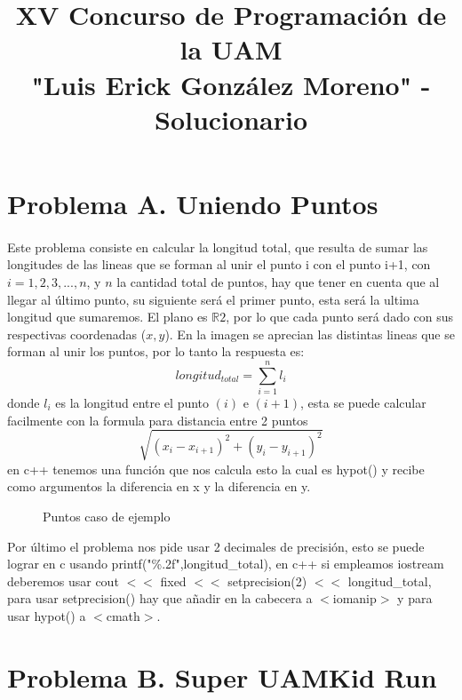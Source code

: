 \documentclass[12pt]{article}
\author{}
\title{XV Concurso de Programación de la UAM \\ 
"Luis Erick González Moreno" - Solucionario}
\begin{document}
    \maketitle
    \newpage
    \section*{Problema A. Uniendo Puntos}
    \paragraph{}
    \singlespacing
    Este problema consiste en calcular la longitud total, que resulta de sumar las longitudes de las 
    lineas que se forman al unir el punto i con el punto i+1, con $i = 1,2,3,...,n$, y $n$ la cantidad total de puntos,
    hay que tener en cuenta que al llegar al último punto, su siguiente 
    será el primer punto, esta será la ultima longitud que sumaremos. El plano es $\mathbb{R}2$, por lo que cada punto será
    dado con sus respectivas coordenadas ($x, y$). En la imagen se aprecian las distintas lineas que se forman al unir los puntos,
    por lo tanto la respuesta es: \[ longitud_{total} = \sum_{i=1}^{n} l_{i} \] donde $l_{i}$ es la 
    longitud entre el punto $(i)$ e $(i+1)$, esta se puede calcular facilmente con la formula para distancia entre 2 puntos
    \[ \sqrt{(x_{i} - x_{i+1})^2 + (y_{i} - y_{i+1})^2} \]en c++ tenemos una función que nos calcula esto
    la cual es hypot() y recibe como argumentos la diferencia en x y la diferencia en y.
     
    \begin{figure}[h]
        \centering
        \caption{Puntos caso de ejemplo}
    \end{figure}

    Por último el problema nos pide usar 2
    decimales de precisión, esto se puede lograr en c usando printf("\%.2f",longitud\_total), en c++ si empleamos iostream
    deberemos usar cout $<<$ fixed $<<$ setprecision(2) $<<$ longitud\_total, para usar setprecision() hay que añadir
    en la cabecera a $<$iomanip$>$ y para usar hypot() a $<$cmath$>$.
    \newpage
    \section*{Problema B. Super UAMKid Run}
\end{document}
